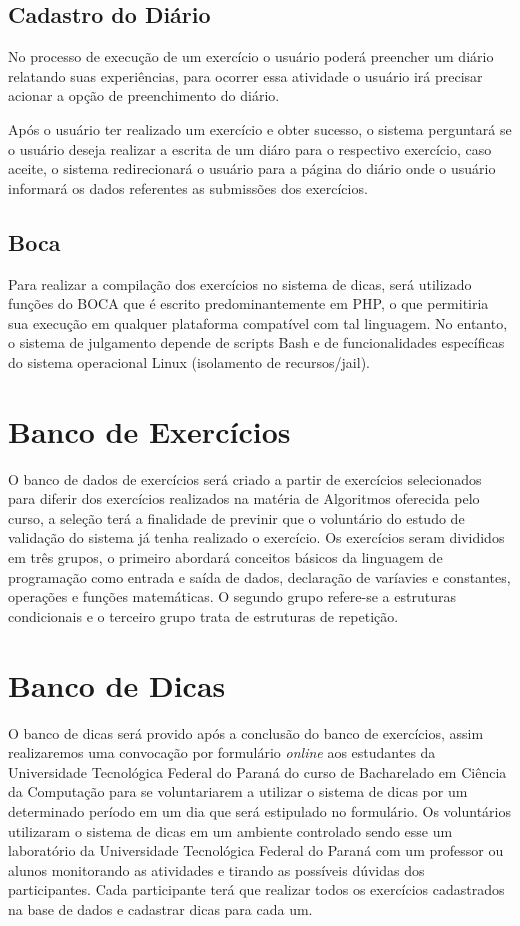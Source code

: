 \subsection{Cadastro do Diário}

No processo de execução de um exercício o usuário poderá preencher um diário relatando suas experiências, para ocorrer essa atividade o usuário irá precisar acionar a opção de preenchimento do diário.  

Após o usuário ter realizado um exercício e obter sucesso, o sistema perguntará se o usuário deseja realizar a escrita de um diáro para o respectivo exercício, caso aceite, o sistema redirecionará o usuário para a página do diário onde o usuário informará os dados referentes as submissões dos exercícios.

\subsection{Boca}

Para realizar a compilação dos exercícios no sistema de dicas, será utilizado funções do  BOCA que é escrito predominantemente em PHP, o que permitiria sua execução em qualquer plataforma compatível com tal linguagem. No entanto, o sistema de julgamento depende de scripts Bash e de funcionalidades específicas do sistema operacional Linux (isolamento de recursos/jail). 

\section{Banco de Exercícios}

O banco de dados de exercícios será criado a partir de exercícios selecionados para diferir dos exercícios realizados na matéria de Algoritmos oferecida pelo curso, a seleção terá a finalidade de previnir que o voluntário do estudo de validação do sistema já tenha realizado o exercício. Os exercícios seram divididos em três grupos, o primeiro abordará conceitos básicos da linguagem de programação como entrada e saída de dados, declaração de varíavies e constantes, operações e funções matemáticas. O segundo grupo refere-se a estruturas condicionais e o terceiro grupo trata de estruturas de repetição.

\section{Banco de Dicas}

O banco de dicas será provido após a conclusão do banco de exercícios, assim realizaremos uma convocação por formulário \textit{online} aos estudantes da Universidade Tecnológica Federal do Paraná do curso de Bacharelado em Ciência da Computação para se voluntariarem a utilizar o sistema de dicas por um determinado período em um dia que será estipulado no formulário. Os voluntários utilizaram o sistema de dicas em um ambiente controlado sendo esse um laboratório da Universidade Tecnológica Federal do Paraná com um professor ou alunos monitorando as atividades e tirando as possíveis dúvidas dos participantes. Cada participante terá que realizar todos os exercícios cadastrados na base de dados e cadastrar dicas para cada um.